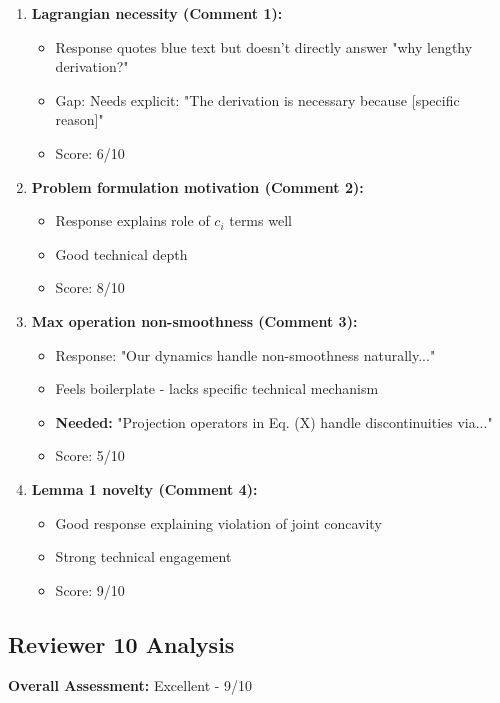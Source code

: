 \documentclass[11pt]{article}
\begin{document}
\begin{enumerate}
\item \textbf{Lagrangian necessity (Comment 1):}
   \begin{itemize}
   \item Response quotes blue text but doesn't directly answer "why lengthy derivation?"
   \item \textcolor{warning}{Gap:} Needs explicit: "The derivation is necessary because [specific reason]"
   \item Score: 6/10
   \end{itemize}

\item \textbf{Problem formulation motivation (Comment 2):}
   \begin{itemize}
   \item Response explains role of $c_i$ terms well
   \item Good technical depth
   \item Score: 8/10
   \end{itemize}

\item \textbf{Max operation non-smoothness (Comment 3):}
   \begin{itemize}
   \item Response: "Our dynamics handle non-smoothness naturally..."
   \item \textcolor{warning}{Feels boilerplate} - lacks specific technical mechanism
   \item \textbf{Needed:} "Projection operators in Eq. (X) handle discontinuities via..."
   \item Score: 5/10
   \end{itemize}

\item \textbf{Lemma 1 novelty (Comment 4):}
   \begin{itemize}
   \item Good response explaining violation of joint concavity
   \item Strong technical engagement
   \item Score: 9/10
   \end{itemize}
\end{enumerate}

\subsection{Reviewer 10 Analysis}

\textbf{Overall Assessment:} \textcolor{success}{Excellent - 9/10}
\end{document}

